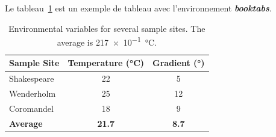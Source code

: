 \documentclass[12pt]{article} %
\begin{document}
Le tableau~\ref{tab:env} est un exemple de tableau avec l'environnement \textbf{\textit{booktabs}}.

\begin{table}[!ht]
	\centering
	\begin{tabular}{lcc}
		\toprule
        \textbf{Sample Site} & \textbf{Temperature (\si{\celsius})} & \textbf{Gradient (\si{\degree})}\\
		\midrule
		Shakespeare & 22 & 5\\
		Wenderholm & 25 & 12\\
		Coromandel & 18 & 9\\
		\midrule
		\textbf{Average} & \textbf{21.7} & \textbf{8.7}\\
		\bottomrule
	\end{tabular}
    \caption{Environmental variables for several sample sites. The average is \SI{217e-1}{\celsius}.}
	\label{tab:env}
\end{table}



\end{document}
